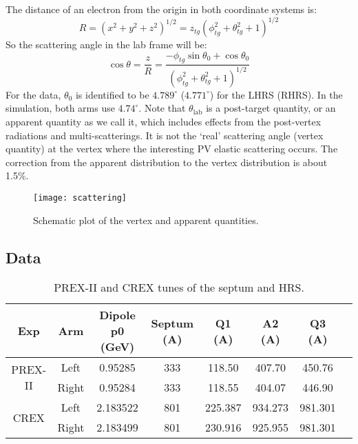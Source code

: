 The distance of an electron from the origin in both coordinate systems is:
\begin{equation}
    R = \left(x^2 + y^2 + z^2\right)^{1/2} = z_{tg} \left(\phi^2_{tg} + \theta^2_{tg} + 1\right)^{1/2}
\end{equation}
So the scattering angle in the lab frame will be:
\begin{equation}
    \cos\theta = \frac{z}{R} = \frac{-\phi_{tg}\sin\theta_0 + \cos\theta_0}{\left(\phi^2_{tg} + \theta^2_{tg} + 1\right)^{1/2}}
\end{equation}
For the data, $\theta_0$ is identified to be $4.789^\circ$ ($4.771^\circ$) for the
LHRS (RHRS). In the simulation, both arms use $4.74^\circ$. Note that $\theta_{\text{lab}}$
is a post-target quantity, or an apparent quantity as we call it, 
which includes effects from the post-vertex radiations and multi-scatterings. 
It is not the `real' scattering angle (vertex quantity) at the vertex 
where the interesting PV elastic scattering occurs. The correction from the apparent 
distribution to the vertex distribution is about 1.5\%.
\begin{figure}[!h]
    \centering
    \texttt{[image: scattering]}
    \caption{Schematic plot of the vertex and apparent quantities.}
\end{figure}

\subsection{Data}
\begin{table}[!h]
    \begin{tabular}{c c | c | c | c c c c}
	\hline
	Exp & Arm   & Dipole p0 (GeV)    & Septum (A)  & Q1 (A)	& A2 (A) & Q3 (A)  \\
	\hline
	\multirow{2}{*}{PREX-II} & Left	& 0.95285   & 333   & 118.50	& 407.70    & 450.76    \\
				 & Right& 0.95284   & 333   & 118.55	& 404.07    & 446.90    \\
	\hline
	\multirow{2}{*}{CREX}	& Left	& 2.183522  & 801   & 225.387	& 934.273   & 981.301    \\
				& Right	& 2.183499  & 801   & 230.916	& 925.955   & 981.301    \\
	\hline
    \end{tabular}
    \caption{PREX-II and CREX tunes of the septum and HRS.}
    \label{tab:pcrex_tune}
\end{table}

